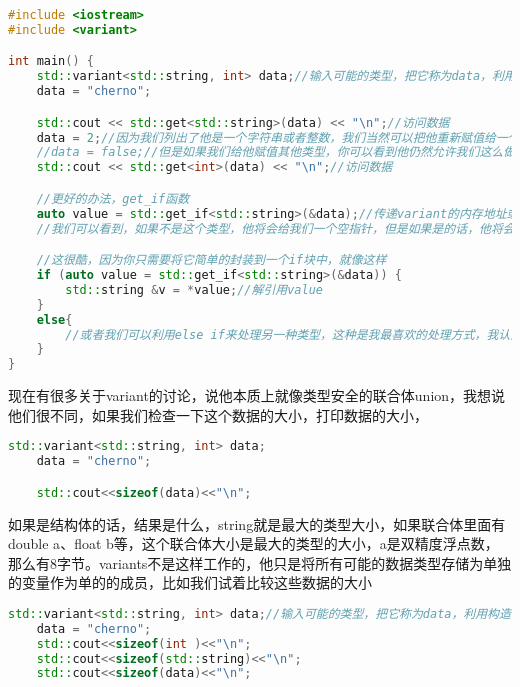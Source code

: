 \begin{lstlisting}[language=c++]
#include <iostream>
#include <variant>

int main() {
    std::variant<std::string, int> data;//输入可能的类型，把它称为data，利用构造函数给他赋值，但是为了更明确一点，我们也可以使用赋值操作符
    data = "cherno";

    std::cout << std::get<std::string>(data) << "\n";//访问数据
    data = 2;//因为我们列出了他是一个字符串或者整数，我们当然可以把他重新赋值给一个字符串或整数
    //data = false;//但是如果我们给他赋值其他类型，你可以看到他仍然允许我们这么做，但是如果我们这样做，我们实际上以后就不能访问他了，这不是我们想要的
    std::cout << std::get<int>(data) << "\n";//访问数据

    //更好的办法，get_if函数
    auto value = std::get_if<std::string>(&data);//传递variant的内存地址或指针，然后这将为我们返回一个指针，所以我们可以检查这个指针是否为空
    //我们可以看到，如果不是这个类型，他将会给我们一个空指针，但是如果是的话，他将会给我们一个指向那个字符串的指针

    //这很酷，因为你只需要将它简单的封装到一个if块中，就像这样
    if (auto value = std::get_if<std::string>(&data)) {
        std::string &v = *value;//解引用value
    }
    else{
        //或者我们可以利用else if来处理另一种类型，这种是我最喜欢的处理方式，我认为他很干净，让我们得到期望的类型的那个值
    }
}
\end{lstlisting}

现在有很多关于{\ncodestyle variant}的讨论，说他本质上就像类型安全的联合体{\ncodestyle union}，我想说他们很不同，如果我们检查一下这个数据的大小，打印数据的大小，

\begin{lstlisting}[language=c++]
    std::variant<std::string, int> data;
    data = "cherno";

    std::cout<<sizeof(data)<<"\n";
\end{lstlisting}

如果是结构体的话，结果是什么，{\ncodestyle string}就是最大的类型大小，如果联合体里面有{\ncodestyle double a}、{\ncodestyle float b}等，这个联合体大小是最大的类型的大小，{\ncodestyle a}是双精度浮点数，那么有8字节。{\ncodestyle variants}不是这样工作的，他只是将所有可能的数据类型存储为单独的变量作为单的的成员，比如我们试着比较这些数据的大小

\begin{lstlisting}[language=c++]
    std::variant<std::string, int> data;//输入可能的类型，把它称为data，利用构造函数给他赋值，但是为了更明确一点，我们也可以使用赋值操作符
    data = "cherno";
    std::cout<<sizeof(int )<<"\n";
    std::cout<<sizeof(std::string)<<"\n";
    std::cout<<sizeof(data)<<"\n";
\end{lstlisting}

